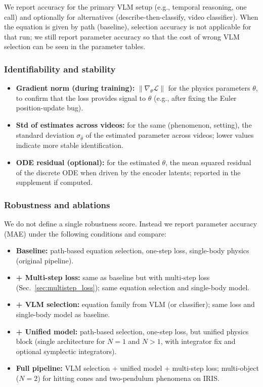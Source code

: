 We report accuracy for the primary VLM setup (e.g., temporal reasoning, one call) and optionally for alternatives (describe-then-classify, video classifier). When the equation is given by path (baseline), selection accuracy is not applicable for that run; we still report parameter accuracy so that the cost of wrong VLM selection can be seen in the parameter tables.

\subsubsection{Identifiability and stability}
\label{sec:metrics_id}

\begin{itemize}[noitemsep]
  \item \textbf{Gradient norm (during training):} $\bigl\| \nabla_{\theta} \mathcal{L} \bigr\|$ for the physics parameters $\theta$, to confirm that the loss provides signal to $\theta$ (e.g., after fixing the Euler position-update bug).
  \item \textbf{Std of estimates across videos:} for the same (phenomenon, setting), the standard deviation $\sigma_{\hat{\theta}}$ of the estimated parameter across videos; lower values indicate more stable identification.
  \item \textbf{ODE residual (optional):} for the estimated $\theta$, the mean squared residual of the discrete ODE when driven by the encoder latents; reported in the supplement if computed.
\end{itemize}

\subsubsection{Robustness and ablations}
\label{sec:metrics_robust}

We do not define a single robustness score. Instead we report parameter accuracy (MAE) under the following conditions and compare:

\begin{itemize}[noitemsep]
  \item \textbf{Baseline:} path-based equation selection, one-step loss, single-body physics (original pipeline).
  \item \textbf{+ Multi-step loss:} same as baseline but with multi-step loss (Sec.~\ref{sec:multistep_loss}); same equation selection and single-body model.
  \item \textbf{+ VLM selection:} equation family from VLM (or classifier); same loss and single-body model as baseline.
  \item \textbf{+ Unified model:} path-based selection, one-step loss, but unified physics block (single architecture for $N=1$ and $N>1$, with integrator fix and optional symplectic integrators).
  \item \textbf{Full pipeline:} VLM selection + unified model + multi-step loss; multi-object ($N=2$) for hitting cones and two-pendulum phenomena on IRIS.
\end{itemize}

